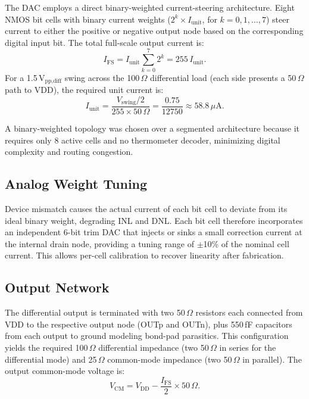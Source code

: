 \documentclass[lettersize,journal]{IEEEtran}
\begin{document}
The DAC employs a direct binary-weighted current-steering architecture.
Eight NMOS bit cells with binary current weights ($2^k \times I_\text{unit}$, for
$k = 0, 1, \ldots, 7$) steer current to either the positive or negative output node
based on the corresponding digital input bit.
The total full-scale output current is:
%
\begin{equation}
  I_\text{FS} = I_\text{unit} \sum_{k=0}^{7} 2^k = 255\, I_\text{unit}.
  \label{eq:ifs}
\end{equation}
%
For a 1.5\,V$_{\text{pp,diff}}$ swing across the 100\,$\Omega$ differential load
(each side presents a 50\,$\Omega$ path to VDD), the required unit current is:
%
\begin{equation}
  I_\text{unit} = \frac{V_\text{swing}/2}{255 \times 50\,\Omega}
                = \frac{0.75}{12750} \approx 58.8\,\mu\text{A}.
  \label{eq:iunit}
\end{equation}

A binary-weighted topology was chosen over a segmented architecture because it
requires only 8 active cells and no thermometer decoder, minimizing digital
complexity and routing congestion.

\subsection{Analog Weight Tuning}

Device mismatch causes the actual current of each bit cell to deviate from its
ideal binary weight, degrading INL and DNL.
Each bit cell therefore incorporates an independent 6-bit trim DAC that
injects or sinks a small correction current at the internal drain node,
providing a tuning range of $\pm$10\% of the nominal cell current.
This allows per-cell calibration to recover linearity after fabrication.

\subsection{Output Network}

The differential output is terminated with two 50\,$\Omega$ resistors each
connected from VDD to the respective output node (OUTp and OUTn), plus
550\,fF capacitors from each output to ground modeling bond-pad parasitics.
This configuration yields the required 100\,$\Omega$ differential impedance
(two 50\,$\Omega$ in series for the differential mode) and 25\,$\Omega$
common-mode impedance (two 50\,$\Omega$ in parallel).
The output common-mode voltage is:
%
\begin{equation}
  V_\text{CM} = V_\text{DD} - \frac{I_\text{FS}}{2} \times 50\,\Omega.
  \label{eq:vcm}
\end{equation}
\end{document}

